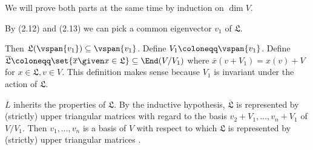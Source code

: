 We will prove both parts at the same time by induction on $\dim V$.

By (2.12) and (2.13) we can pick a common eigenvector $v_1$ of $\mathfrak{L}$.

Then  $\mathfrak{L}(\vspan{v_1}) \subseteq \vspan{v_1}$. Define
$V_1\coloneqq \vspan{v_1}$.
Define $\overline{\mathfrak{L}}\coloneqq \set{\overline{x}\given x \in \mathfrak{L}} \subseteq \End (V/V_1)$
where $\overline{x}(v + V_1) = x(v) + V$ for  $x \in \mathfrak{L}, v \in V$.
This definition makes sense because $V_1$ is invariant under the action of $\mathfrak{L}$.

$\overline{L}$ inherits the properties of $\mathfrak{L}$. By the inductive hypothesis,
$\overline{\mathfrak{L}}$ is represented by (strictly) upper triangular matrices
with regard to the basis $v_2 + V_1, \ldots, v_n + V_1$ of $V/V_1$. Then
$v_1, \ldots, v_n$ is a basis of $V$ with respect to which $\mathfrak{L}$ is represented
by (strictly) upper triangular matrices .
